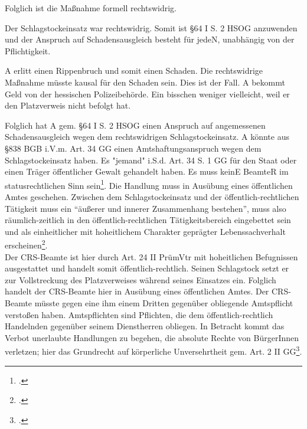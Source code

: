\documentclass[widefront, ngerman]{jura}
\begin{document}
Folglich ist die Maßnahme formell rechtswidrig.

\levelup {}
Der Schlagstockeinsatz war rechtswidrig. Somit ist §64 I S. 2 HSOG anzuwenden und der Anspruch auf Schadensausgleich besteht für jedeN, unabhängig von der Pflichtigkeit.

\levelup {}
A erlitt einen Rippenbruch und somit einen Schaden.
Die rechtswidrige Maßnahme müsste kausal für den Schaden sein. Dies ist der Fall.
\levelup {}
A bekommt Geld von der hessischen Polizeibehörde.
Ein bisschen weniger vielleicht, weil er den Platzverweis nicht befolgt hat.

\levelup {}
Folglich hat A gem. §64 I S. 2 HSOG einen Anspruch auf angemessenen Schadensausgleich wegen dem rechtswidrigen Schlagstockeinsatz.
\levelup {}
A könnte aus §838 BGB i.V.m. Art. 34 GG einen Amtshaftungsanspruch wegen dem Schlagstockeinsatz haben.
Es "jemand" i.S.d. Art. 34 S. 1 GG für den Staat oder einen Träger öffentlicher Gewalt gehandelt haben. Es muss keinE BeamteR im statusrechtlichen Sinn sein\footcite[Rn 1055]{detterbeckVerwR}. Die Handlung muss in Ausübung eines öffentlichen Amtes geschehen. Zwischen dem Schlagstockeinsatz und der öffentlich-rechtlichen Tätigkeit muss ein "`äußerer und innerer Zusammenhang bestehen"', muss also räumlich-zeitlich in den öffentlich-rechtlichen Tätigkeitsbereich eingebettet sein und als einheitlicher mit hoheitlichem Charakter geprägter Lebenssachverhalt erscheinen\footcite[Rn 1058ff.]{detterbeckVerwR}.\\
Der CRS-Beamte ist hier durch Art. 24 II PrümVtr mit hoheitlichen Befugnissen ausgestattet und handelt somit öffentlich-rechtlich. Seinen Schlagstock setzt er zur Vollstreckung des Platzverweises während seines Einsatzes ein. Folglich handelt der CRS-Beamte hier in Ausübung eines öffentlichen Amtes.
Der CRS-Beamte müsste gegen eine ihm einem Dritten gegenüber obliegende Amtspflicht verstoßen haben.
Amtspflichten sind Pflichten, die dem öffentlich-rechtlich Handelnden gegenüber seinem Dienstherren obliegen. In Betracht kommt das Verbot unerlaubte Handlungen zu begehen, die absolute Rechte von BürgerInnen verletzen; hier das Grundrecht auf körperliche Unversehrtheit gem. Art. 2 II GG\footcite[Rn 1065]{detterbeckVerwR}.
\end{document}
